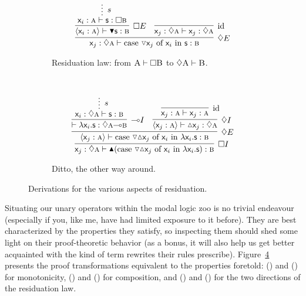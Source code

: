 \begin{figure}
\begin{subfigure}{0.5\textwidth}
		\label{subfigure:modal_properties:interior}
	\end{subfigure}\\[\midsep]
	\begin{subfigure}{1\textwidth}
		\[
			\infer[\diamond E]{\term{\varj}: \diamond \prop{a} \vdash \caseof{\diaelim \varj}{\vari }{s}:\prop{b}}{
				\infer[\Box E]{\bracket{\term{\vari }: \prop{a}} \vdash \boxelim\term{s}: \prop{b}}{
					\infer*[s]{\term{\vari }: \prop{a} \vdash \term{s}: \Box\prop{b}}{}
				}
				&
				\infer[\Ax]{\term{\varj}: \diamond \prop{a} \vdash \term{\varj}: \diamond \prop{a}}{}
			}
		\]
	\caption{Residuation law: from $\normalfont\textsc{A} \vdash \Box\normalfont\textsc{B}$ to $\diamond\smallprop{A} \vdash \smallprop{B}$.}
	\label{subfigure:modal_properties:residuation:1}	
	\end{subfigure}\\[\midsep]
	\begin{subfigure}{1\textwidth}
		\[
			\infer[\Box I]{\term{\varj}: \diamond \prop{a} \vdash \boxintro(\caseof{\diaelim \diaintro \varj}{\vari }{\lam \vari .s}): \prop{b}}{
				\infer[\diamond E]{\bracket{\term{\varj}: \prop{a}} \vdash \caseof{\diaelim \diaintro \varj}{\vari }{\lam \vari .s}: \prop{b}}{
					\infer[\li I]{\vdash \term{\lam \vari .s}: \diamond\prop{a} \li \prop{b}}{
						\infer*[s]{\term{\vari }: \diamond\prop{a} \vdash \term{s}: \prop{b}}{}
					}
					&
					\infer[\diamond I]{\bracket{\term{\varj}: \prop{a}} \vdash \term{\diaintro \varj}: \diamond \prop{a}}{
						\infer[\Ax]{\term{\varj}: \prop{a} \vdash \term{\varj}: \prop{a}}{}
					}
				}
			}
		\]
		\caption{Ditto, the other way around.}
		\label{subfigure:modal_properties:residuation:2}	
	\end{subfigure}
	\caption{Derivations for the various aspects of residuation.}
	\label{figure:modal_properties:residuation}
\end{figure}

Situating our unary operators within the modal logic zoo is no trivial endeavour (especially if you, like me, have had limited exposure to it before).
They are best characterized by the properties they satisfy, so inspecting them should shed some light on their proof-theoretic behavior (as a bonus, it will also help us get better acquainted with the kind of term rewrites their rules prescribe).
Figure~\ref{figure:modal_properties:residuation} presents the proof transformations equivalent to the properties foretold:
 () and () for monotonicity, () and () for composition, and () and () for the two directions of the residuation law.
 
